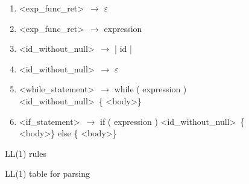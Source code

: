 \documentclass[a4paper, 11pt]{article}
\begin{document}
\begin{figure}[ht]
\begin{center}
\begin{enumerate}
        \item \textless exp\_func\_ret\textgreater\ $\to$ $\varepsilon$
        \item \textless exp\_func\_ret\textgreater\ $\to$ expression
        \item \textless id\_without\_null\textgreater\ $\to$ | id |
        \item \textless id\_without\_null\textgreater\ $\to$ $\varepsilon$
        \item \textless while\_statement\textgreater\ $\to$ while ( expression ) \textless id\_without\_null\textgreater\ \{ \textless body\textgreater \}
        \item \textless if\_statement\textgreater\ $\to$ if ( expression ) \textless id\_without\_null\textgreater\ \{ \textless body\textgreater \} else \{ \textless body\textgreater \}
    \end{enumerate}
    \caption{LL(1) rules}
    \label{ll1rules}
\end{center}
\end{figure}

\begin{figure}[ht]
    \begin{center}
        \caption{LL(1) table for parsing}
        \label{ll1table}
    \end{center}
\end{figure}
\end{document}
